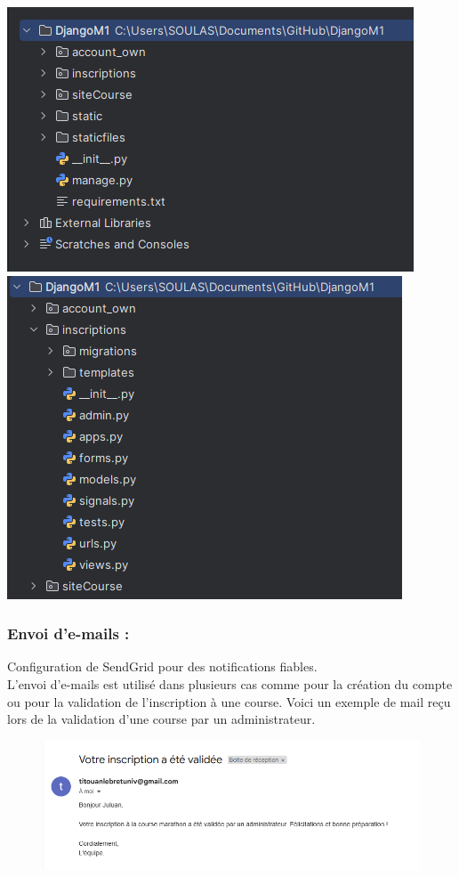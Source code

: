 \documentclass[12pt]{article} %
\begin{document}
            \includegraphics[scale=0.6]{images/Capture_structure.PNG}
            \includegraphics[scale=0.6]{images/Capture_structure-inscription.PNG}

        \subsubsection{Envoi d’e-mails :}
            Configuration de SendGrid pour des notifications fiables.\\
            L’envoi d’e-mails est utilisé dans plusieurs cas comme pour la création du compte ou pour la validation de l’inscription à une course. Voici un exemple de mail reçu lors de la validation d'une course par un administrateur.
    
            \begin{figure}[hbtp]
            \centering
            \includegraphics[scale=0.8]{images/validationMAIL.PNG}
            \end{figure}
\end{document}
